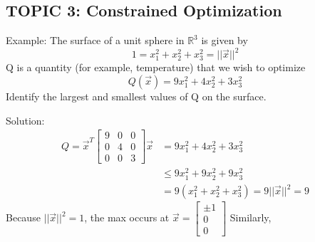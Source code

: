 \documentclass[12pt]{article} %
\newcommand{\R}{\mathbb{R}}
\begin{document}
\subsection{TOPIC 3: Constrained Optimization}
Example: The surface of a unit sphere in $\R^3$ is given by 
$$1 = x_1^2 +x_2^2 + x_3^2 = ||\vec{x}||^2$$
Q is a quantity (for example, temperature) that we wish to optimize
$$Q(\vec{x}) = 9x_1^2 + 4x_2^2 + 3x_3^2$$
Identify the largest and smallest values of Q on the surface.

Solution:
\begin{align*}
	Q = \vec{x}^T \begin{bmatrix}
		9 & 0 & 0\\
		0 & 4 & 0\\
		0 & 0 & 3
	\end{bmatrix} \vec{x} &= 9x_1^2 + 4x_2^2 + 3x_3^2\\
	&\leq  9x_1^2 + 9x_2^2 + 9x_3^2\\
	&= 9(x_1^2 +x_2^2 + x_3^2) = 9||\vec{x}||^2 = 9
\end{align*}
Because $||\vec{x}||^2 = 1$, the max occurs at $\vec{x} = \begin{bmatrix}
	\pm 1\\
	0\\
	0
\end{bmatrix}$ 
Similarly,
\end{document}
